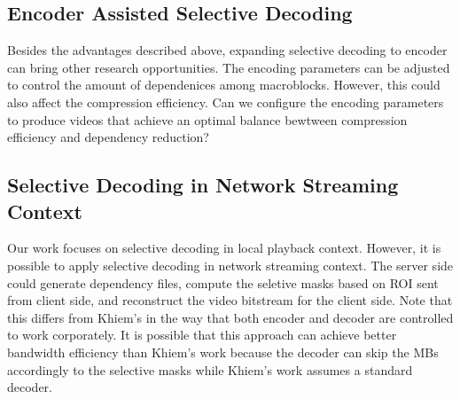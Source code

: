 \subsection{Encoder Assisted Selective Decoding}
Besides the advantages described above, expanding selective decoding to encoder can bring other research opportunities. The encoding parameters can be adjusted to control the amount of dependenices among macroblocks. However, this could also affect the compression efficiency. Can we configure the encoding parameters to produce videos that achieve an optimal balance bewtween compression efficiency and dependency reduction? 

\subsection{Selective Decoding in Network Streaming Context}
Our work focuses on selective decoding in local playback context. However, it is possible to apply selective decoding in network streaming context. The server side could generate dependency files, compute the seletive masks based on ROI sent from client side, and reconstruct the video bitstream for the client side. Note that this differs from Khiem's \cite{Ngo:2011:AEZ:1943552.1943581} in the way that both encoder and decoder are controlled to work corporately. It is possible that this approach can achieve better bandwidth efficiency than Khiem's work because the decoder can skip the MBs accordingly to the selective masks while Khiem's work assumes a standard decoder.  


